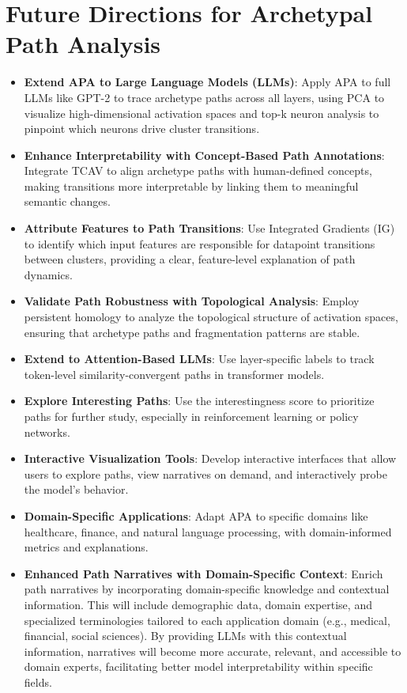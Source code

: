 \section{Future Directions for Archetypal Path Analysis}

\begin{itemize}
    \item \textbf{Extend APA to Large Language Models (LLMs)}: Apply APA to full LLMs like GPT-2 to trace archetype paths across all layers, using PCA to visualize high-dimensional activation spaces and top-k neuron analysis to pinpoint which neurons drive cluster transitions.
    
    \item \textbf{Enhance Interpretability with Concept-Based Path Annotations}: Integrate TCAV to align archetype paths with human-defined concepts, making transitions more interpretable by linking them to meaningful semantic changes.
    
    \item \textbf{Attribute Features to Path Transitions}: Use Integrated Gradients (IG) to identify which input features are responsible for datapoint transitions between clusters, providing a clear, feature-level explanation of path dynamics.
    
    \item \textbf{Validate Path Robustness with Topological Analysis}: Employ persistent homology to analyze the topological structure of activation spaces, ensuring that archetype paths and fragmentation patterns are stable.
    
    \item \textbf{Extend to Attention-Based LLMs}: Use layer-specific labels to track token-level similarity-convergent paths in transformer models.
    
    \item \textbf{Explore Interesting Paths}: Use the interestingness score to prioritize paths for further study, especially in reinforcement learning or policy networks.
    
    \item \textbf{Interactive Visualization Tools}: Develop interactive interfaces that allow users to explore paths, view narratives on demand, and interactively probe the model's behavior.
    
    \item \textbf{Domain-Specific Applications}: Adapt APA to specific domains like healthcare, finance, and natural language processing, with domain-informed metrics and explanations.
    
    \item \textbf{Enhanced Path Narratives with Domain-Specific Context}: Enrich path narratives by incorporating domain-specific knowledge and contextual information. This will include demographic data, domain expertise, and specialized terminologies tailored to each application domain (e.g., medical, financial, social sciences). By providing LLMs with this contextual information, narratives will become more accurate, relevant, and accessible to domain experts, facilitating better model interpretability within specific fields.
\end{itemize}

